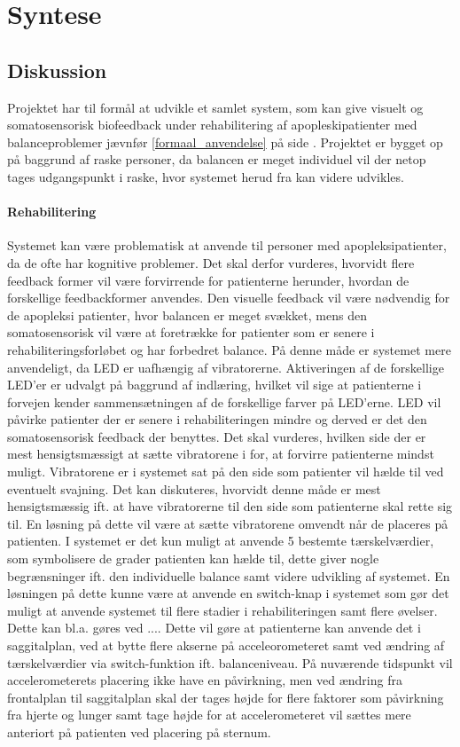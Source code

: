 \chapter{Syntese}
\section{Diskussion}
Projektet har til formål at udvikle et samlet system, som kan give visuelt og somatosensorisk biofeedback under rehabilitering af apopleskipatienter med balanceproblemer jævnfør \ref{formaal_anvendelse} på side \pageref{formaal_anvendelse}. Projektet er bygget op på baggrund af raske personer, da balancen er meget individuel vil der netop tages udgangspunkt i raske, hvor systemet herud fra kan videre udvikles. 

\subsubsection{Rehabilitering}
Systemet kan være problematisk at anvende til personer med apopleksipatienter, da de ofte har kognitive problemer. Det skal derfor vurderes, hvorvidt flere feedback former vil være forvirrende for patienterne herunder, hvordan de forskellige feedbackformer anvendes. Den visuelle feedback vil være nødvendig for de apopleksi patienter, hvor balancen er meget svækket, mens den somatosensorisk vil være at foretrække for patienter som er senere i rehabiliteringsforløbet og har forbedret balance. På denne måde er systemet mere anvendeligt, da LED er uafhængig af vibratorerne. Aktiveringen af de forskellige LED'er er udvalgt på baggrund af indlæring, hvilket vil sige at patienterne i forvejen kender sammensætningen af de forskellige farver på LED'erne.
LED vil påvirke patienter der er senere i rehabiliteringen mindre og derved er det den somatosensorisk feedback der benyttes. Det skal vurderes, hvilken side der er mest hensigtsmæssigt at sætte vibratorene i for, at forvirre patienterne mindst muligt. Vibratorene er i systemet sat på den side som patienter vil hælde til ved eventuelt svajning. Det kan diskuteres, hvorvidt denne måde er mest hensigtsmæssig ift. at have vibratorerne til den side som patienterne skal rette sig til. En løsning på dette vil være at sætte vibratorene omvendt når de placeres på patienten. 
I systemet er det kun muligt at anvende 5 bestemte  tærskelværdier, som symbolisere de grader patienten kan hælde til, dette giver nogle begrænsninger ift. den individuelle balance samt videre udvikling af systemet. En løsningen på dette kunne være at anvende en switch-knap  i systemet som gør det muligt at anvende systemet til flere stadier i rehabiliteringen samt flere øvelser. Dette kan bl.a. gøres ved .... Dette vil gøre at patienterne kan anvende det i saggitalplan, ved at bytte flere akserne på acceleorometeret samt ved ændring af tærskelværdier via switch-funktion ift. balanceniveau. På nuværende tidspunkt vil accelerometerets placering ikke have en påvirkning, men ved ændring fra frontalplan til saggitalplan skal der tages højde for flere faktorer som påvirkning fra hjerte og lunger samt tage højde for at accelerometeret vil sættes mere anteriort på patienten ved placering på sternum. 

